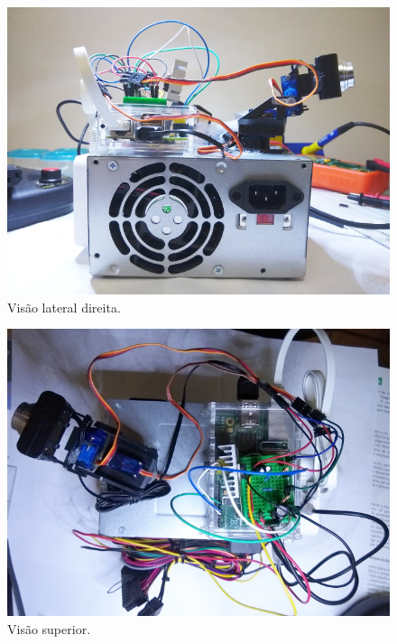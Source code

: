 \begin{apendicesenv}
\begin{figure}[H]
	\centering
	\includegraphics[width=1\linewidth]{figuras/vista_direita}
	\caption{Visão lateral direita.}
	\label{fig:vistadireita}
\end{figure}

\begin{figure}[H]
	\centering
	\includegraphics[width=1\linewidth]{figuras/vista_superior}
	\caption{Visão superior.}
	\label{fig:vistasuperior}
\end{figure}


\end{apendicesenv}
